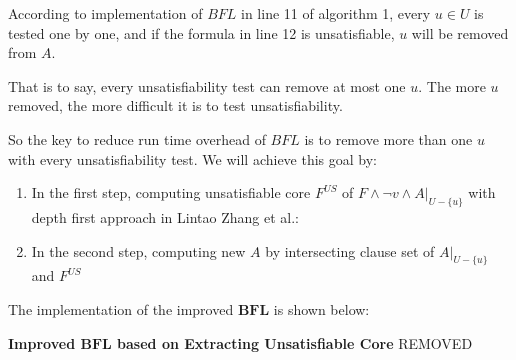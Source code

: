 \documentclass[journal]{IEEEtran}
\begin{document}
According to implementation of $BFL$ in line 11 of algorithm 1,
every $u\in U$ is tested one by one,
and if the formula in line 12 is unsatisfiable,
$u$ will be removed from $A$.

That is to say,
every unsatisfiability test can remove at most one $u$.
The more $u$ removed,
the more difficult it is to test unsatisfiability.

So the key to reduce run time overhead of $BFL$ is to remove more than one $u$ with every unsatisfiability test.
We will achieve this goal by:
\begin{enumerate}
\item In the first step,
computing unsatisfiable core $F^{US}$ of $F\wedge \neg v\wedge A|_{U -\{u\}}$ with depth first approach in Lintao Zhang et al.\cite{VALIDSAT}:
\item In the second step,
computing new $A$ by intersecting clause set of $A|_{U-\{u\}}$ and $F^{US}$
\end{enumerate}

The implementation of the improved $\boldsymbol{BFL}$ is shown below:
\vspace{0.2cm}
\begin{algo}
\textbf{Improved $\boldsymbol{BFL}$ based on Extracting Unsatisfiable Core}
REMOVED
\end{algo}
\end{document}
